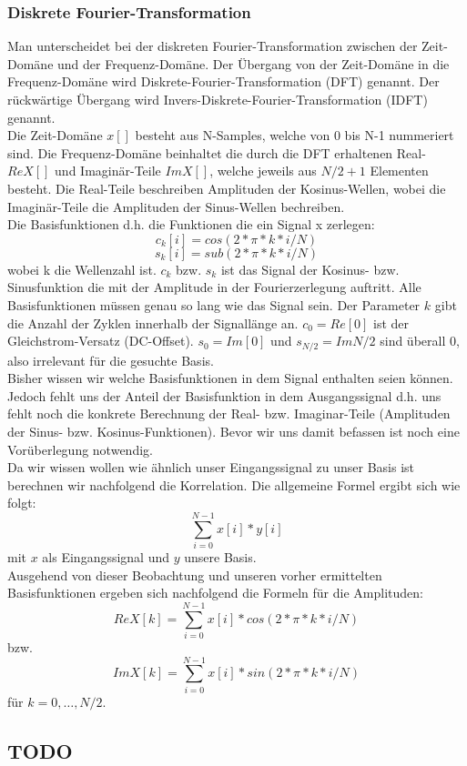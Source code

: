\documentclass{article} %
\begin{document}
		\subsubsection{Diskrete Fourier-Transformation}
		Man unterscheidet bei der diskreten Fourier-Transformation zwischen der Zeit-Domäne und der Frequenz-Domäne. Der Übergang von der Zeit-Domäne in die Frequenz-Domäne wird Diskrete-Fourier-Transformation (DFT) genannt. Der rückwärtige Übergang wird Invers-Diskrete-Fourier-Transformation (IDFT) genannt.\\
		Die Zeit-Domäne $x[]$ besteht aus N-Samples, welche von 0 bis N-1 nummeriert sind. Die Frequenz-Domäne beinhaltet die durch die DFT erhaltenen Real- $ReX[]$ und Imaginär-Teile $ImX[]$, welche jeweils aus $N/2+1$ Elementen besteht. Die Real-Teile beschreiben Amplituden der Kosinus-Wellen, wobei die Imaginär-Teile die Amplituden der Sinus-Wellen bechreiben.\\
		Die Basisfunktionen d.h. die Funktionen die ein Signal x zerlegen:
			$$c_{k}[i]=cos(2*\pi*k*i/N)$$
			$$s_{k}[i]=sub(2*\pi*k*i/N)$$
		wobei k die Wellenzahl ist. $c_{k}$ bzw. $s_{k}$ ist das Signal der Kosinus- bzw. Sinusfunktion die mit der Amplitude in der Fourierzerlegung auftritt. Alle Basisfunktionen müssen genau so lang wie das Signal sein. Der Parameter $k$ gibt die Anzahl der Zyklen innerhalb der Signallänge an. $c_{0} = Re[0]$ ist der Gleichstrom-Versatz (DC-Offset). $s_{0} = Im[0]$ und $s_{N/2} = Im{N/2}$ sind überall 0, also irrelevant für die gesuchte Basis.\\
		Bisher wissen wir welche Basisfunktionen in dem Signal enthalten seien können. Jedoch fehlt uns der Anteil der Basisfunktion in dem Ausgangssignal d.h. uns fehlt noch die konkrete Berechnung der Real- bzw. Imaginar-Teile (Amplituden der Sinus- bzw. Kosinus-Funktionen). Bevor wir uns damit befassen ist noch eine Vorüberlegung notwendig.\\
		Da wir wissen wollen wie ähnlich unser Eingangssignal zu unser Basis ist berechnen wir nachfolgend die Korrelation. Die allgemeine Formel ergibt sich wie folgt:
		$$ \sum_{i=0}^{N-1} x[i]*y[i]$$ mit $x$ als Eingangssignal und $y$ unsere Basis.\\
		Ausgehend von dieser Beobachtung und unseren vorher ermittelten Basisfunktionen ergeben sich nachfolgend die Formeln für die Amplituden:
		$$ReX[k] =\sum_{i=0}^{N-1} x[i]*cos(2*\pi*k*i/N) $$ bzw. $$ImX[k] =\sum_{i=0}^{N-1} x[i]*sin(2*\pi*k*i/N) $$ für $k = 0,\dots,N/2$.
		\subsection{TODO}
		
\end{document}
